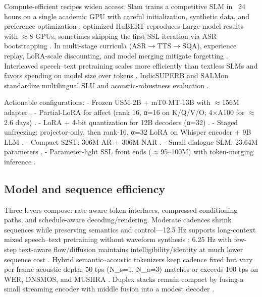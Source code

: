 \documentclass{article}
\begin{document}
Compute-efficient recipes widen access: Slam trains a competitive SLM in ~24 hours on a single academic GPU with careful initialization, synthetic data, and preference optimization \cite{maimon2025slammingtrainingspeechlanguagemodelonegp}; optimized HuBERT reproduces Large-model results with $\approx$8 GPUs, sometimes skipping the first SSL iteration via ASR bootstrapping \cite{chen2023reducingbarriersselfsupervisedlearninghu}. In multi-stage curricula (ASR$\rightarrow$TTS$\rightarrow$SQA), experience replay, LoRA-scale discounting, and model merging mitigate forgetting \cite{hsiao2025analyzingmitigationstrategiescatastrophi}. Interleaved speech--text pretraining scales more efficiently than textless SLMs and favors spending on model size over tokens \cite{maimon2025scalinganalysisinterleavedspeechtextlang}. IndicSUPERB and SALMon standardize multilingual SLU and acoustic-robustness evaluation \cite{entry2025indicsuperbspeechprocessinguniversalperf,maimon2025salmonsuiteacousticlanguagemodelevaluati}.

Actionable configurations:
- Frozen USM-2B + mT0-MT-13B with $\approx$156M adapter \cite{wang2023slmbridgethingapbetweenspeechtextfoundat}.
- Partial-LoRA for affect (rank 16, α=16 on K/Q/V/O; 4$\times$A100 for $\approx$2.6 days) \cite{wang2024blspemotowardsempatheticlargespeechlangu}.
- LoRA + 4-bit quantization for 12B decoders (α=32) \cite{nguyen2025qwenvsgemmaintegrationwhispercomparative}.
- Staged unfreezing: projector-only, then rank-16, α=32 LoRA on Whisper encoder + 9B LLM \cite{li2025seewossubmissionmlcslmlessonslearnedspee}.
- Compact S2ST: 306M AR + 306M NAR \cite{peng2024mslms2stmultitaskspeechlanguagemodeltext}.
- Small dialogue SLM: 23.64M parameters \cite{nakata2024jchatjapaneselargescalespokendialoguecor}.
- Parameter-light SSL front ends ($\approx$95--100M) with token-merging inference \cite{chen2023reducingbarriersselfsupervisedlearninghu,lu2024fastadaspmultitaskadaptedefficientinfere,maimon2025scalinganalysisinterleavedspeechtextlang}.

\subsection{Model and sequence efficiency} \label{subsec:modelandsequenceefficiency}
Three levers compose: rate-aware token interfaces, compressed conditioning paths, and schedule-aware decoding/rendering. Moderate cadences shrink sequences while preserving semantics and control---12.5 Hz supports long-context mixed speech--text pretraining without waveform synthesis \cite{zeng2024scalingspeechtextpretrainingsyntheticint}; 6.25 Hz with few-step text-aware flow/diffusion maintains intelligibility/identity at much lower sequence cost \cite{wang2025tadicodectextawarediffusionspeechtokeniz}. Hybrid semantic--acoustic tokenizers keep cadence fixed but vary per-frame acoustic depth; 50 tps (N_s=1, N_a=3) matches or exceeds 100 tps on WER, DNSMOS, and MUSHRA \cite{yang2025diffsoundstreamefficientspeechtokenizati}. Duplex stacks remain compact by fusing a small streaming encoder with middle fusion into a modest decoder \cite{ma2024languagemodelcanlistenwhilespeaking}.
\end{document}
